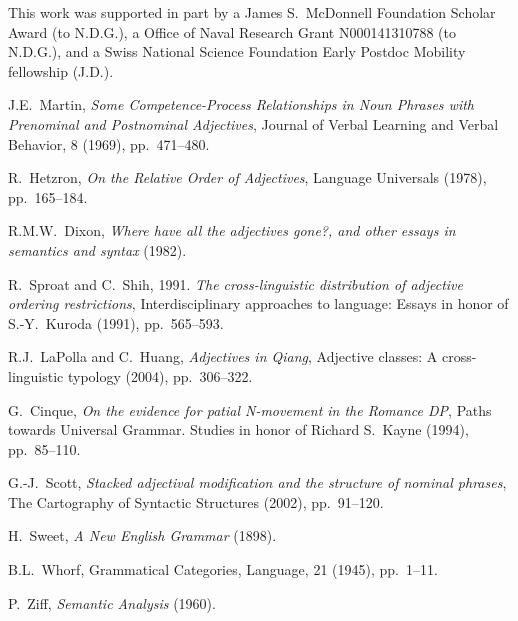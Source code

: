 \documentclass{pnastwo}
\begin{document}
\begin{article}
\begin{materials}
\end{materials}


\begin{acknowledgments}
This work was supported in part by a James S.~McDonnell Foundation Scholar Award (to N.D.G.), a Office of Naval Research Grant N000141310788 (to N.D.G.), and a Swiss National Science Foundation Early Postdoc Mobility fellowship (J.D.).
\end{acknowledgments}

\begin{thebibliography}{10}

	J.E.~Martin, {\em Some Competence-Process Relationships in Noun Phrases with Prenominal and Postnominal Adjectives}, Journal of Verbal Learning and Verbal Behavior, 8 (1969), pp.~471--480. 	
	
	R.~Hetzron, {\em On the Relative Order of Adjectives}, Language Universals (1978), pp.~165--184.
	
	R.M.W.~Dixon, {\em Where have all the adjectives gone?, and other essays in semantics and syntax} (1982).
	
	R.~Sproat and C.~Shih, 1991. {\em The cross-linguistic distribution of adjective ordering restrictions}, Interdisciplinary approaches to language: Essays in honor of S.-Y.~Kuroda (1991), pp.~565--593.

	R.J.~LaPolla and C.~Huang, {\em Adjectives in Qiang}, Adjective classes: A cross-linguistic typology (2004), pp.~306--322.

	G.~Cinque, {\em On the evidence for patial N-movement in the Romance DP}, Paths towards Universal Grammar. Studies in honor of Richard S.~Kayne (1994), pp.~85--110.

	G.-J.~Scott, {\em Stacked adjectival modification and the structure of nominal phrases}, The Cartography of Syntactic Structures (2002), pp.~91--120.

	H.~Sweet, {\em A New English Grammar} (1898).
		
		
	B.L.~Whorf, Grammatical Categories, Language, 21 (1945), pp.~1--11. 
	
	P.~Ziff, {\em Semantic Analysis} (1960).
		

\end{thebibliography}
\end{article}
\end{document}
